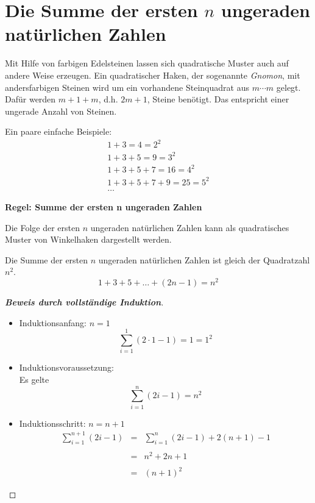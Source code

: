 %
%

\chapter{Die Summe der ersten $n$ ungeraden natürlichen Zahlen}

Mit Hilfe von farbigen Edelsteinen lassen sich quadratische Muster
auch auf andere Weise erzeugen. Ein quadratischer Haken, der
sogenannte \textit{Gnomon}, mit andersfarbigen Steinen wird
um ein vorhandene Steinquadrat aus $m \cdots m$ gelegt.
Dafür werden $m + 1 + m$, d.h. $2m + 1$, Steine benötigt.
Das entspricht einer ungerade Anzahl von Steinen.

Ein paare einfache Beispiele:
\[
 \begin{array}{l}
  1 + 3 = 4 = 2^2 \\ 
  1 + 3 + 5 = 9 = 3^2 \\ 
  1 + 3 + 5 + 7 = 16 = 4^2 \\ 
  1 + 3 + 5 + 7 + 9 = 25 = 5^2 \\
  \dots
 \end{array}
\]

\textbf{Regel: Summe der ersten n ungeraden Zahlen}

Die Folge der ersten $n$ ungeraden natürlichen Zahlen
kann als quadratisches Muster von Winkelhaken
dargestellt werden.

Die Summe der ersten $n$ ungeraden natürlichen Zahlen
ist gleich der Quadratzahl $n^2$.
\begin{equation}
  1 + 3 + 5 + \dots + (2n - 1) = n^2
  \label{eq:formel_ungerade_natuerliche_zahlen}
\end{equation}

\begin{proof}[\textbf{Beweis durch vollständige Induktion}]
 $\text{}$
 
 \begin{itemize}
  \item Induktionsanfang: $n = 1$
        \[
         \sum_{i=1}^{1} (2\cdot 1 - 1) = 1 = 1^2
        \]
  \item Induktionsvoraussetzung:\\  
        Es gelte
        \[
         \sum_{i=1}^{n} (2i - 1) = n^2
        \]
  \item Induktionsschritt: $n = n + 1$
        \[
         \begin{array}{rcl}
           \sum\limits_{i=1}^{n+1} (2i -1)
           & = & \sum\limits_{i=1}^{n} (2i -1) + 2(n+1)-1 \\\\
           & = & n^2 + 2n + 1 \\\\
           & = & (n+1)^2
         \end{array}
        \]
 \end{itemize}
\end{proof}

